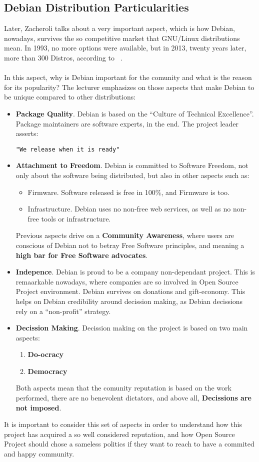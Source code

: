\documentclass[11pt]{article}
\begin{document}
\subsection{Debian Distribution Particularities}
Later, Zacheroli talks about a very important aspect, which is how Debian, nowadays, survives the so competitive market that GNU/Linux distributions mean. In 1993, no more options were available, but in 2013, twenty years later, more than 300 Distros, according to ~\cite{DISTW00}.\\
\\
In this aspect, why is Debian important for the comunity and what is the reason for its popularity? The lecturer emphasizes on those aspects that make Debian to be unique compared to other distributions:
\begin{itemize}
\item{\textbf{Package Quality}}. Debian is based on the ``Culture of Technical Excellence''. Package maintainers are software experts, in the end. The project leader asserts:
\begin{verbatim}
"We release when it is ready"
\end{verbatim}
\item{\textbf{Attachment to Freedom}}. Debian is committed to Software Freedom, not only about the software being distributed, but also in other aspects such as:
\begin{itemize}\itemsep0pt
\item{Firmware}. Software released is free in 100\%, and Firmware is too.
\item{Infrastructure}. Debian uses no non-free web services, as well as no non-free tools or infrastructure.
\end{itemize}
Previous aspects drive on a \textbf{Community Awareness}, where users are conscious of Debian not to betray Free Software principles, and meaning a \textbf{high bar for Free Software advocates}.
\item{\textbf{Indepence}}. Debian is proud to be a company non-dependant project. This is remaarkable nowadays, where companies are so involved in Open Source Project environment. Debian survives on donations and gift-economy. This helps on Debian credibility around decission making, as Debian decissions rely on a ``non-profit'' strategy.
\item{\textbf{Decission Making}}. Decission making on the project is based on two main aspects:
\begin{enumerate}\itemsep0pt
\item{\textbf{Do-ocracy}}
\item{\textbf{Democracy}}
\end{enumerate}
Both aspects mean that the comunity reputation is based on the work performed, there are no benevolent dictators, and above all, \textbf{Decissions are not imposed}.
\end{itemize}
It is important to consider this set of aspects in order to understand how this project has acquired a so well considered reputation, and how Open Source Project should chose a sameless politics if they want to reach to have a commited and happy community.
\end{document}
